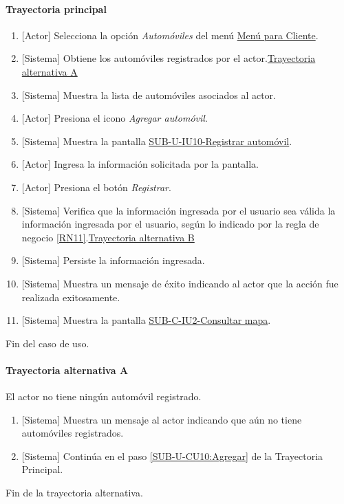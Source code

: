\paragraph{Trayectoria principal}
	\begin{enumerate}
		\item {[Actor]} Selecciona la opción \textit{Automóviles} del menú \hyperref[fig:menu-cliente]{Menú para Cliente}.
		\item {[Sistema]} Obtiene los automóviles registrados por el actor.\hyperref[SUB-U-CU10:TA]{Trayectoria alternativa A}
		\item {[Sistema]} Muestra la lista de automóviles asociados al actor.
		\item \label{SUB-U-CU10:Agregar} {[Actor]} Presiona el icono \textit{Agregar automóvil}.
		\item {[Sistema]} Muestra la pantalla \hyperref[fig:sub-u-iu10]{SUB-U-IU10-Registrar automóvil}.
		\item \label{SUB-U-CU10:Ingresar} {[Actor]} Ingresa la información solicitada por la pantalla.
		\item {[Actor]} Presiona el botón \textit{Registrar}.
		\item {[Sistema]} Verifica que la información ingresada por el usuario sea válida la información ingresada por el usuario, según lo indicado por la regla de negocio \ref{RN11}.\hyperref[SUB-U-CU10:TB]{Trayectoria alternativa B}
		\item {[Sistema]} Persiste la información ingresada.
		\item {[Sistema]} Muestra un mensaje de éxito indicando al actor que la acción fue realizada exitosamente.
		\item \label{SUB-U-CU10:Pantalla} {[Sistema]} Muestra la pantalla \hyperref[fig:sub-c-iu2]{SUB-C-IU2-Consultar mapa}.
	\end{enumerate}
	Fin del caso de uso.

\paragraph{Trayectoria alternativa A} \label{SUB-U-CU10:TA}
	El actor no tiene ningún automóvil registrado.
	\begin{enumerate}[label=A\arabic*.]
		\item {[Sistema]} Muestra un mensaje al actor indicando que aún no tiene automóviles registrados.
		\item {[Sistema]} Continúa en el paso \ref{SUB-U-CU10:Agregar} de la Trayectoria Principal.
	\end{enumerate}
	Fin de la trayectoria alternativa.


